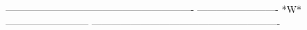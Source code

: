  
 
 
 
 
 
 
 
 
 
 
 
 
 
 
 
 
 
 
 
 
 
 
 
 
 
 
 
 
 
----------------------------------------------------------
-------------------------  *W*  --------------------------
----------------------------------------------------------
 
 
 
 
 
 
 
 
 
 
 
 
 
 
 
 
 
 
 
 
 
 
 
 
 
 
 
 
 
 
 
 
 
 
 
 
 
 
 
 
 
 
 
 
 
 
 
 
 
 
 
 
 
 
 
 
 
 
 
 
 
 
 
 
 
 
 
 
 
 
 
 
 
 
 
 
 
 
 
 
 

